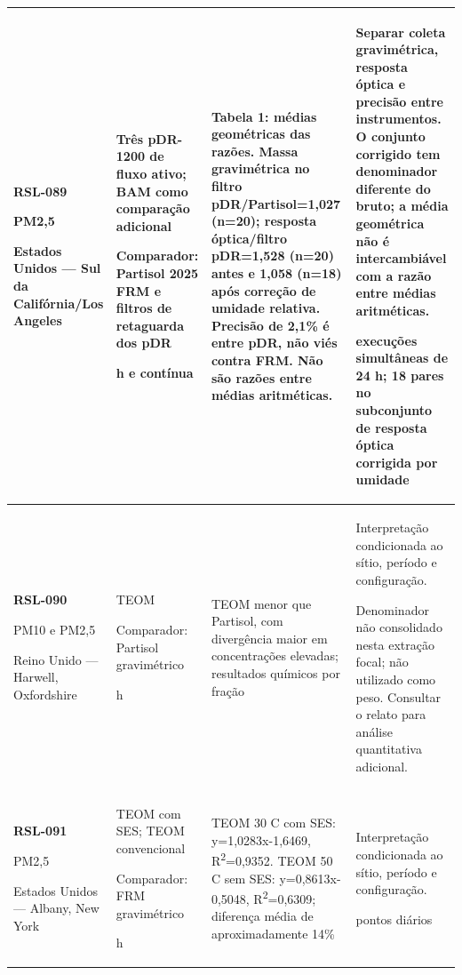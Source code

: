 \begin{longtable}{|P{0.18\textwidth}|P{0.25\textwidth}|P{0.28\textwidth}|P{\arrayrulewidth\relax}|}
\textbf{RSL-089}\par\textcite{rsl089}\par PM2,5\par Estados Unidos --- Sul da Califórnia/Los Angeles & Três pDR-1200 de fluxo ativo; BAM como comparação adicional\par\medskip Comparador: Partisol 2025 FRM e filtros de retaguarda dos pDR\par{} h e contínua & Tabela 1: médias geométricas das razões. Massa gravimétrica no filtro pDR/Partisol=1,027 (n=20); resposta óptica/filtro pDR=1,528 (n=20) antes e 1,058 (n=18) após correção de umidade relativa. Precisão de 2,1\% é entre pDR, não viés contra FRM. Não são razões entre médias aritméticas. & Separar coleta gravimétrica, resposta óptica e precisão entre instrumentos. O conjunto corrigido tem denominador diferente do bruto; a média geométrica não é intercambiável com a razão entre médias aritméticas.\par{} execuções simultâneas de 24 h; 18 pares no subconjunto de resposta óptica corrigida por umidade\\\hline
\textbf{RSL-090}\par\textcite{rsl090}\par PM10 e PM2,5\par Reino Unido --- Harwell, Oxfordshire & TEOM\par\medskip Comparador: Partisol gravimétrico\par{} h & TEOM menor que Partisol, com divergência maior em concentrações elevadas; resultados químicos por fração & Interpretação condicionada ao sítio, período e configuração.\par\medskip Denominador não consolidado nesta extração focal; não utilizado como peso. Consultar o relato para análise quantitativa adicional.\\\hline
\textbf{RSL-091}\par\textcite{rsl091}\par PM2,5\par Estados Unidos --- Albany, New York & TEOM com SES; TEOM convencional\par\medskip Comparador: FRM gravimétrico\par{} h & TEOM 30 \textdegree{}C com SES: y=1,0283x-1,6469, R\textsuperscript{2}=0,9352. TEOM 50 \textdegree{}C sem SES: y=0,8613x-0,5048, R\textsuperscript{2}=0,6309; diferença média de aproximadamente 14\% & Interpretação condicionada ao sítio, período e configuração.\par{} pontos diários\\\hline

\end{longtable}
